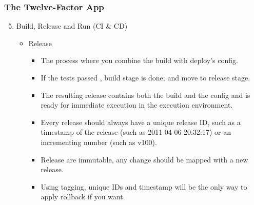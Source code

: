 \documentclass{beamer}
\begin{document}
		\begin{frame}
			\frametitle{The Twelve-Factor App}
				\begin{enumerate}
					\setcounter{enumi}{4}
					\item Build, Release and Run (CI \& CD) \\
					\vspace{2mm}
					\begin{itemize}
						\item {Release}
						\begin{itemize}
							\item<1-> \scriptsize {The process where you combine the build with deploy's config}.\vspace{2mm}
							\item<2-> \scriptsize {If the tests passed , build stage is done; and move to release stage}.\vspace{2mm}
							\item<3-> \scriptsize {The resulting release contains both the build and the config and is ready for immediate execution in the execution environment}.\vspace{2mm}
							\item<4-> \scriptsize {Every release should always have a unique release ID, such as a timestamp of the release (such as 2011-04-06-20:32:17) or an incrementing number (such as v100)}.\vspace{2mm}
							\item<5-> \scriptsize {Release are immutable, any change should be mapped with a new release}.\vspace{2mm}
							\item<6-> \scriptsize {Using tagging, unique IDs and timestamp will be the only way to apply rollback if you want}.
						\end{itemize}
					\end{itemize}
				\end{enumerate}
		\end{frame}
	
\end{document}
